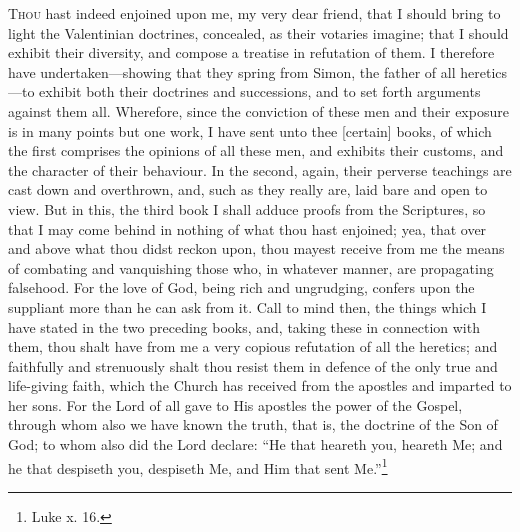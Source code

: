 

\textsc{Thou} hast indeed enjoined upon me, my very dear friend, that I should bring to light the Valentinian doctrines, concealed, as their votaries imagine; that I should exhibit their diversity, and compose a treatise in refutation of them. I therefore have undertaken—showing that they spring from Simon, the father of all heretics—to exhibit both their doctrines and successions, and to set forth arguments against them all. Wherefore, since the conviction of these men and their exposure is in many points but one work, I have sent unto thee [certain] books, of which the first comprises the opinions of all these men, and exhibits their customs, and the character of their behaviour. In the second, again, their perverse teachings are cast down and overthrown, and, such as they really are, laid bare and open to view. But in this, the third book I shall adduce proofs from the Scriptures, so that I may come behind in nothing of what thou hast enjoined; yea, that over and above what thou didst reckon upon, thou mayest receive from me the means of combating and vanquishing those who, in whatever manner, are propagating falsehood. For the love of God, being rich and ungrudging, confers upon the suppliant more than he can ask from it. Call to mind then, the things which I have stated in the two preceding books, and, taking these in connection with them, thou shalt have from me a very copious refutation of all the heretics; and faithfully and strenuously shalt thou resist them in defence of the only true and life-giving faith, which the Church has received from the apostles and imparted to her sons. For the Lord of all gave to His apostles the power of the Gospel, through whom also we have known the truth, that is, the doctrine of the Son of God; to whom also did the Lord declare: “He that heareth you, heareth Me; and he that despiseth you, despiseth Me, and Him that sent Me.”\footnote{Luke x. 16.}


